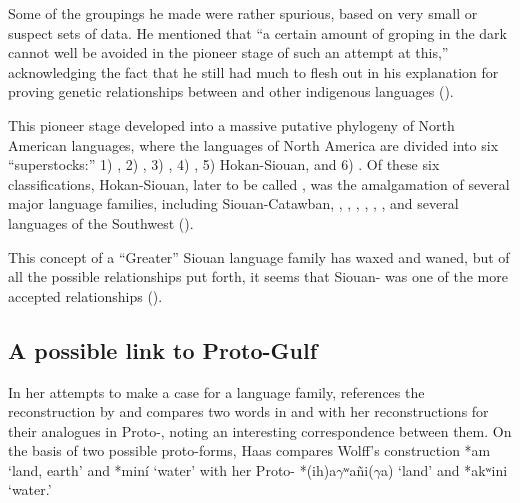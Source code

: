 \documentclass[output=paper]{LSP/langsci}
\begin{document}
Some of the groupings he made were rather spurious, based on very small or suspect sets of data. He mentioned that ``a certain amount of groping in the dark cannot well be avoided in the pioneer stage of such an attempt at this,'' acknowledging the fact that he still had much to flesh out in his explanation for proving genetic relationships between  and other indigenous languages (\citealt[289]{Sapir1920}). 

This pioneer stage developed into a massive putative phylogeny of North American languages, where the languages of North America are divided into six ``superstocks:'' 1) , 2) , 3) , 4) , 5) Hokan-Siouan, and 6) . Of these six classifications, Hokan-Siouan, later to be called , was the amalgamation of several major language families, including Siouan-Catawban, , , , , , , and several languages of the Southwest (\citealt{Sapir1929}). 

This concept of a ``Greater'' Siouan language family has waxed and waned, but of all the possible relationships put forth, it seems that Siouan- was one of the more accepted relationships (\citealt{CampbellMithun1979}).

\subsection{A possible link to Proto-Gulf}

In her attempts to make a case for a  language family, \citet{Haas1951,Haas1952} references the  reconstruction by \citep{Wolff1950a,Wolff1950b,Wolff1950c,Wolff1950d} and compares two words in  and  with her reconstructions for their analogues in Proto-, noting an interesting correspondence between them. On the basis of two possible proto-forms, Haas compares Wolff's  construction *am `land, earth' and *min\'i `water' with her Proto- *(ih)a$\gamma$ʷa\~ni($\gamma$a) `land' and *akʷini `water.' 
\end{document}
